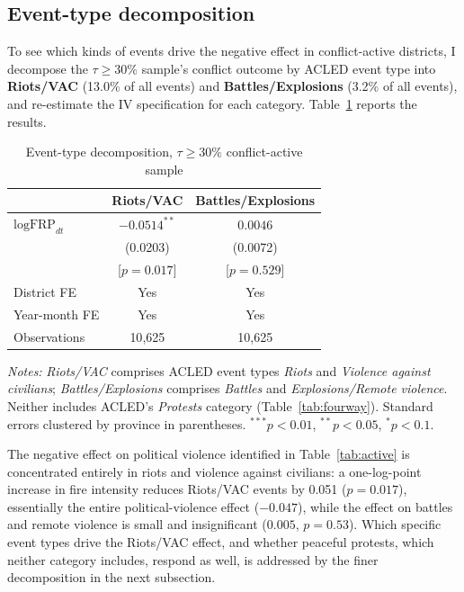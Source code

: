 \documentclass[12pt]{article}
\begin{document}
\subsection{Event-type decomposition}
\label{sec:eventtype}

To see which kinds of events drive the negative effect in conflict-active districts, I decompose the $\tau \geq 30\%$ sample's conflict outcome by ACLED event type into \textbf{Riots/VAC} (13.0\% of all events) and \textbf{Battles/Explosions} (3.2\% of all events), and re-estimate the IV specification for each category. Table~\ref{tab:eventtype} reports the results.

\begin{table}[H]
\centering
\caption{Event-type decomposition, $\tau \geq 30\%$ conflict-active sample}
\label{tab:eventtype}
\begin{tabular}{lcc}
\toprule
 & Riots/VAC & Battles/Explosions \\
\midrule
$\text{logFRP}_{dt}$ & $-0.0514^{**}$ & $0.0046$ \\
                     & (0.0203) & (0.0072) \\
                     & [$p=0.017$] & [$p=0.529$] \\
\midrule
District FE     & Yes & Yes \\
Year-month FE   & Yes & Yes \\
Observations     & 10{,}625 & 10{,}625 \\
\bottomrule
\end{tabular}
\begin{minipage}{0.85\textwidth}
\vspace{4pt}
\footnotesize \emph{Notes:} \emph{Riots/VAC} comprises ACLED event types \emph{Riots} and \emph{Violence against civilians}; \emph{Battles/Explosions} comprises \emph{Battles} and \emph{Explosions/Remote violence}. Neither includes ACLED's \emph{Protests} category (Table~\ref{tab:fourway}). Standard errors clustered by province in parentheses. $^{***}p<0.01$, $^{**}p<0.05$, $^{*}p<0.1$.
\end{minipage}
\end{table}

The negative effect on political violence identified in Table~\ref{tab:active} is concentrated entirely in riots and violence against civilians: a one-log-point increase in fire intensity reduces Riots/VAC events by 0.051 ($p=0.017$), essentially the entire political-violence effect ($-0.047$), while the effect on battles and remote violence is small and insignificant ($0.005$, $p=0.53$). Which specific event types drive the Riots/VAC effect, and whether peaceful protests, which neither category includes, respond as well, is addressed by the finer decomposition in the next subsection.
\end{document}
